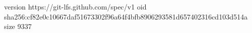 version https://git-lfs.github.com/spec/v1
oid sha256:cf82e0c10667daf51673302f96a64f4bfb8906293581d657402316cd103d514a
size 9337
